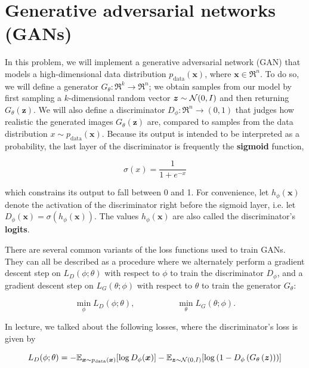 \section{Generative adversarial networks (GANs)}

In this problem, we will implement a generative adversarial network (GAN) that models a high-dimensional data distribution 
$p_{\text{data}}(\bm{x})$, where $\bm{x} \in \Re^{n}$. To do so, we will define a generator $G_{\theta} : \Re^{k} \rightarrow \Re^{n}$; 
we obtain samples from our model by first sampling a $k$-dimensional random vector $\bm{z} \sim \mathcal{N}(0,I)$ and then returning $G_{\theta}(\bm{z})$.
We will also define a discriminator $D_{\phi} : \Re^{n} \rightarrow (0,1)$ that judges how realistic the generated images 
$G_{\theta}(\bm{z})$ are, compared to samples from the data distribution $x \sim p_{\text{data}}(\bm{x})$. Because its 
output is intended to be interpreted as a probability, the last layer of the discriminator is frequently the \textbf{sigmoid} function,

\begin{equation} \label{eq:4}
    \sigma(x) = \frac{1}{1 + e^{-x}}
\end{equation}

which constrains its output to fall between 0 and 1. For convenience, let $h_{\phi}(\bm{x})$ denote the activation of 
the discriminator right before the sigmoid layer, i.e. let $D_{\phi}(\bm{x}) = \sigma(h_{\phi}(\bm{x}))$. The values 
$h_{\phi}(\bm{x})$ are also called the discriminator’s \textbf{logits}.

There are several common variants of the loss functions used to train GANs. They can all be described as a 
procedure where we alternately perform a gradient descent step on $L_{D}(\phi;\theta)$ with respect to $\phi$ to train 
the discriminator $D_{\phi}$, and a gradient descent step on $L_{G}(\theta;\phi)$ with respect to $\theta$ to train the 
generator $G_{\theta}$:

\begin{equation} \label{eq:5}
    \min\limits_{\phi} L_{D}(\phi; \theta), \hspace{5em} \min\limits_{\theta} L_{G}(\theta; \phi).
\end{equation}

In lecture, we talked about the following losses, where the discriminator’s loss is given by

\begin{equation} \label{eq:6}
    L_{D}(\phi; \theta) = - \mathbb{E}_{\bm{x} \sim p_{\text{data}}(\bm{x})} [\log D_{\phi}(\bm{x})] - \mathbb{E}_{\bm{z}\sim\mathcal{N}(0,I)}[\log\left(1-D_{\phi}\left(G_{\theta}\left(\bm{z}\right)\right)\right)]
\end{equation}

